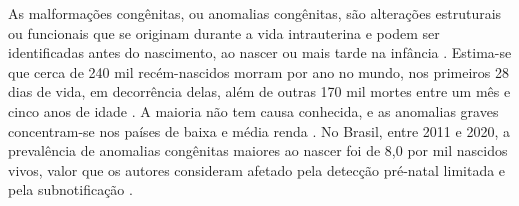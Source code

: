 

As malformações congênitas, ou anomalias congênitas, são alterações estruturais ou funcionais que se originam durante a vida intrauterina e podem ser identificadas antes do nascimento, ao nascer ou mais tarde na infância \cite{who2023congenital}. Estima-se que cerca de 240 mil recém-nascidos morram por ano no mundo, nos primeiros 28 dias de vida, em decorrência delas, além de outras 170 mil mortes entre um mês e cinco anos de idade \cite{who2023congenital}. A maioria não tem causa conhecida, e as anomalias graves concentram-se nos países de baixa e média renda \cite{who2023congenital}.
No Brasil, entre 2011 e 2020, a prevalência de anomalias congênitas maiores ao nascer foi de 8,0 por mil nascidos vivos, valor que os autores consideram afetado pela detecção pré-natal limitada e pela subnotificação \cite{melkan2025}.

